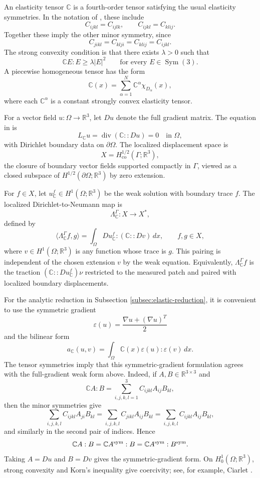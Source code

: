 \documentclass[12pt,oneside]{amsart}
\newcommand{\R}{\mathbb R}
\newcommand{\Sym}{\operatorname{Sym}}
\newcommand{\dual}[2]{\langle #1,#2\rangle}
\begin{document}
An elasticity tensor $\mathbb C$ is a fourth-order tensor satisfying the usual elasticity symmetries.  In the notation of \cite{CarsteaHondaNakamura2018}, these include
\[
        C_{ijkl}=C_{ijlk},
        \qquad
        C_{ijkl}=C_{klij}.
\]
Together these imply the other minor symmetry, since
\[
        C_{jikl}=C_{klji}=C_{klij}=C_{ijkl}.
\]
The strong convexity condition is that there exists $\lambda>0$ such that
\[
        \mathbb C E:E\ge \lambda |E|^2
        \qquad\text{for every }E\in\Sym(3).
\]
A piecewise homogeneous tensor has the form
\[
        \mathbb C(x)=\sum_{\alpha=1}^N\mathbb C^\alpha\chi_{D_\alpha}(x),
\]
where each $\mathbb C^\alpha$ is a constant strongly convex elasticity tensor.

For a vector field $u:\Omega\to\R^3$, let $Du$ denote the full gradient matrix.  The equation in \cite{CarsteaHondaNakamura2018} is
\[
        L_{\mathbb C}u=\operatorname{div}(\mathbb C::Du)=0
        \quad\text{in }\Omega,
\]
with Dirichlet boundary data on $\partial\Omega$.  The localized displacement space is
\[
        X=H^{1/2}_{\operatorname{co}}(\Gamma;\R^3),
\]
the closure of boundary vector fields supported compactly in $\Gamma$, viewed as a closed subspace of $H^{1/2}(\partial\Omega;\R^3)$ by zero extension.

For $f\in X$, let $u_{\mathbb C}^f\in H^1(\Omega;\R^3)$ be the weak solution with boundary trace $f$.  The localized Dirichlet-to-Neumann map is
\[
        \Lambda_{\mathbb C}^\Gamma:X\to X^*,
\]
defined by
\[
        \dual{\Lambda_{\mathbb C}^\Gamma f}{g}
        =\int_\Omega Du_{\mathbb C}^f:(\mathbb C::Dv)\,dx,
        \qquad f,g\in X,
\]
where $v\in H^1(\Omega;\R^3)$ is any function whose trace is $g$.  This pairing is independent of the chosen extension $v$ by the weak equation.  Equivalently, $\Lambda_{\mathbb C}^\Gamma f$ is the traction $(\mathbb C::Du_{\mathbb C}^f)\nu$ restricted to the measured patch and paired with localized boundary displacements.

For the analytic reduction in Subsection \ref{subsec:elastic-reduction}, it is convenient to use the symmetric gradient
\[
        \varepsilon(u)=\frac{\nabla u+(\nabla u)^T}{2}
\]
and the bilinear form
\[
        a_{\mathbb C}(u,v)=
        \int_\Omega \mathbb C(x)\varepsilon(u):\varepsilon(v)\,dx .
\]
The tensor symmetries imply that this symmetric-gradient formulation agrees with the full-gradient weak form above.  Indeed, if $A,B\in\R^{3\times3}$ and
\[
        \mathbb C A:B=\sum_{i,j,k,l=1}^3 C_{ijkl}A_{ij}B_{kl},
\]
then the minor symmetries give
\[
        \sum_{i,j,k,l}C_{ijkl}A_{ji}B_{kl}
        =\sum_{i,j,k,l}C_{jikl}A_{ij}B_{kl}
        =\sum_{i,j,k,l}C_{ijkl}A_{ij}B_{kl},
\]
and similarly in the second pair of indices.  Hence
\[
        \mathbb C A:B=\mathbb C A^{\rm sym}:B
        =\mathbb C A^{\rm sym}:B^{\rm sym}.
\]
Taking $A=Du$ and $B=Dv$ gives the symmetric-gradient form.  On $H^1_0(\Omega;\R^3)$, strong convexity and Korn's inequality give coercivity; see, for example, Ciarlet \cite{Ciarlet1988}.
\end{document}
